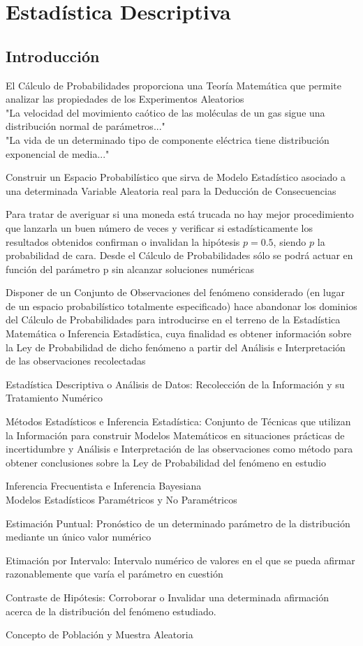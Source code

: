 \section{Estadística Descriptiva}

\subsection{Introducción}
El Cálculo de Probabilidades proporciona una Teoría Matemática que permite analizar las propiedades de los Experimentos Aleatorios\\
"La velocidad del movimiento caótico de las moléculas de un gas sigue una distribución normal de parámetros..."\\
"La vida de un determinado tipo de componente eléctrica tiene distribución exponencial de media..."

Construir un Espacio Probabilístico que sirva de Modelo Estadístico asociado a una determinada Variable Aleatoria real para la Deducción de Consecuencias

Para tratar de averiguar si una moneda está trucada no hay mejor procedimiento que lanzarla un buen número de veces y verificar si estadísticamente los resultados obtenidos confirman o invalidan la hipótesis $p=0.5$, siendo $p$ la probabilidad de cara. Desde el Cálculo de Probabilidades sólo se podrá actuar en función del parámetro p sin alcanzar soluciones numéricas

Disponer de un Conjunto de Observaciones del fenómeno considerado (en lugar de un espacio probabilístico totalmente especificado) hace abandonar los dominios del Cálculo de Probabilidades para introducirse en el terreno de la Estadística Matemática o Inferencia Estadística, cuya finalidad es obtener información sobre la Ley de Probabilidad de dicho fenómeno a partir del Análisis e Interpretación de las observaciones recolectadas

\begin{displayquote}
Estadística Descriptiva o Análisis de Datos: Recolección de la Información y su Tratamiento Numérico
\end{displayquote}

Métodos Estadísticos e Inferencia Estadística: Conjunto de Técnicas que utilizan la Información para construir Modelos Matemáticos en situaciones prácticas de incertidumbre y Análisis e Interpretación de las observaciones como método para obtener conclusiones sobre la Ley de Probabilidad del fenómeno en estudio

Inferencia Frecuentista e Inferencia Bayesiana\\
Modelos Estadísticos Paramétricos y No Paramétricos

Estimación Puntual: Pronóstico de un determinado parámetro de la distribución mediante un único valor numérico

Etimación por Intervalo: Intervalo numérico de valores en el que se pueda afirmar razonablemente que varía el parámetro en cuestión

Contraste de Hipótesis: Corroborar o Invalidar una determinada afirmación acerca de la distribución del fenómeno estudiado.

Concepto de Población y Muestra Aleatoria

